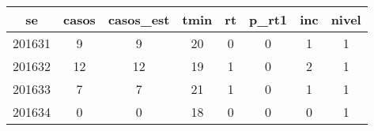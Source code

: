 \begin{tabular}{c|ccccccc}
  \hline
se & casos & casos\_est & tmin & rt & p\_rt1 & inc & nivel \\ 
  \hline
201631 & 9 & 9 & 20 & 0 & 0 & 1 & 1 \\ 
  201632 & 12 & 12 & 19 & 1 & 0 & 2 & 1 \\ 
  201633 & 7 & 7 & 21 & 1 & 0 & 1 & 1 \\ 
  201634 & 0 & 0 & 18 & 0 & 0 & 0 & 1 \\ 
   \hline
\end{tabular}
